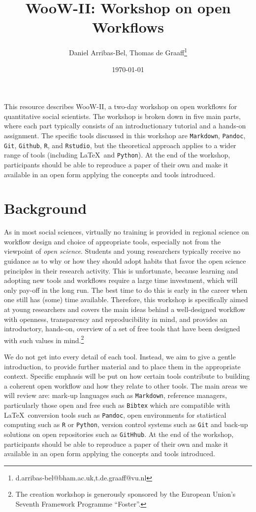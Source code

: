 \documentclass[scrartcl,a4paper,utopia,10pt]{article}
\title{WooW-II: Workshop on open Workflows}
\author{Daniel Arribas-Bel, Thomas de Graaff\thanks{d.arribas-bel@bham.ac.uk,t.de.graaff@vu.nl}}
\date{\today}
\begin{document}
\maketitle

This resource describes WooW-II, a two-day workshop on open workflows for quantitative social scientists. The workshop is broken down in five main parts, where each part typically consists of an introductionary tutorial and a hands-on assignment. The specific tools discussed in this workshop are \texttt{Markdown}, \texttt{Pandoc}, \texttt{Git}, \texttt{Github}, \texttt{R}, and \texttt{Rstudio}, but the theoretical approach applies to a wider range of tools (including \LaTeX \, and \texttt{Python}). At the end of the workshop, participants should be able to reproduce a paper of their own and make it available in an open form applying the concepts and tools introduced.

\section{Background}
\label{sec-1}

As in most social sciences, virtually no training is provided in regional science on workflow design and choice of appropriate tools, especially not from the viewpoint of \emph{open science}. Students and young researchers typically receive no guidance as to why or how they should adopt habits that favor the open science principles in their research activity. This is unfortunate, because learning and adopting new tools and workflows require a large time investment, which will only pay-off in the long run. The best time to do this is early in the career when one still has (some) time available. Therefore, this workshop is specifically aimed at young researchers and covers the main ideas behind a well-designed workflow with openness, transparency and reproducibility in mind, and provides an introductory, hands-on, overview of a set of free tools that have been designed with such values in mind.\footnote{The creation workshop is generously sponsored by the European Union's Seventh Framework Programme ``Foster''.
 }

We do not get into every detail of each tool. Instead, we aim to give a gentle introduction, to provide further material and to place them in the appropriate context. Specific emphasis will be put on how certain tools contribute to building a coherent open workflow and how they relate to other tools. The main areas we will review are: mark-up languages such as \texttt{Markdown}, reference managers, particularly those open and free such as \texttt{Bibtex} which are compatible with \LaTeX \, conversion tools such as \texttt{Pandoc}, open environments for statistical computing such as \texttt{R} or \texttt{Python}, version control systems such as \texttt{Git} and back-up solutions on open repositories such as \texttt{GitHhub}. At the end of the workshop, participants should be able to reproduce a paper of their own and make it available in an open form applying the concepts and tools introduced.
\end{document}
